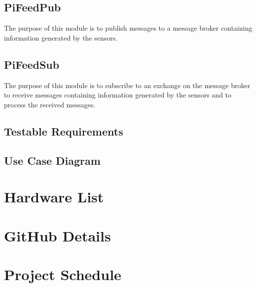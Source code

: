 \subsection{PiFeedPub}
The purpose of this module is to publish messages to a message broker containing
information generated by the sensors.

\subsection{PiFeedSub}
The purpose of this module is to subscribe to an exchange on the message broker
to receive messages containing information generated by the sensors and to
process the received messages.

\subsection{Testable Requirements}
\subsection{Use Case Diagram}

\section{Hardware List}

\section{GitHub Details}

\section{Project Schedule}


